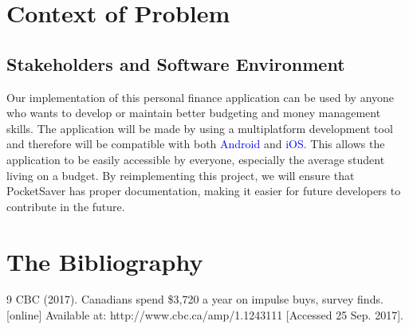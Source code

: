 \documentclass[12pt]{article}
\begin{document}
\section{Context of Problem}
\subsection{Stakeholders and Software Environment}
Our implementation of this personal finance application can be used by anyone who wants to develop or maintain better budgeting and money management skills. The application will be made by using a multiplatform development tool and therefore will be compatible with both \textcolor{blue}{Android} and \textcolor{blue}{iOS}. This allows the application to be easily accessible by everyone, especially the average student living on a budget. By reimplementing this project, we will ensure that PocketSaver has proper documentation, making it easier for future developers to contribute in the future.


\section{The Bibliography}{9}
CBC (2017). Canadians spend \$3,720 a year on impulse buys, survey finds. [online] Available at: http://www.cbc.ca/amp/1.1243111 [Accessed 25 Sep. 2017].
\end{document}
